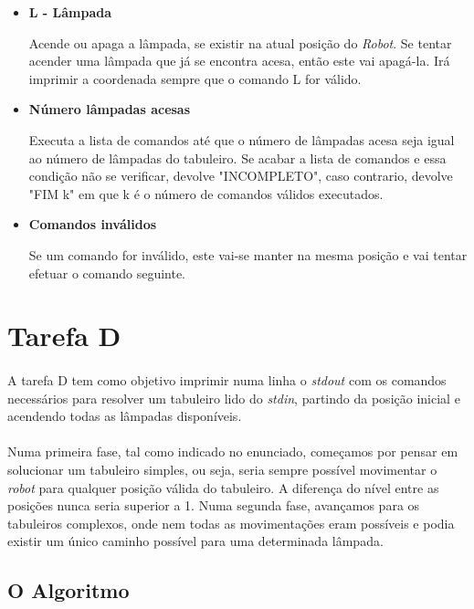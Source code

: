 \documentclass[a4paper,12pt]{article}
\begin{document}
\begin{itemize}
\item {\textbf{L - Lâmpada}}

Acende ou apaga a lâmpada, se existir na atual posição do \emph{Robot}. Se tentar acender uma lâmpada que já se encontra acesa, então este vai apagá-la. Irá imprimir a coordenada sempre que o comando L for válido.

\item {\textbf{Número lâmpadas acesas}}

Executa a lista de comandos até que o número de lâmpadas acesa seja igual ao número de lâmpadas do tabuleiro. Se acabar a lista de comandos e essa condição não se verificar, devolve "INCOMPLETO", caso contrario, devolve "FIM k" em que k é o número de comandos válidos executados.

\item {\textbf{Comandos inválidos}}

Se um comando for inválido, este vai-se manter na mesma posição e vai tentar efetuar o comando seguinte.

\end{itemize}


\section{Tarefa D}

\paragraph{}
A tarefa D tem como objetivo imprimir numa linha o \emph{stdout} com os comandos necessários para resolver um tabuleiro lido do \emph{stdin}, partindo da posição inicial e acendendo todas as lâmpadas disponíveis.

\paragraph{}
Numa primeira fase, tal como indicado no enunciado, começamos por pensar em solucionar um tabuleiro simples, ou seja, seria sempre possível movimentar o \emph{robot} para qualquer posição válida do tabuleiro. A diferença do nível entre as posições nunca seria superior a 1. Numa segunda fase, avançamos para os tabuleiros complexos, onde nem todas as movimentações eram possíveis e podia existir um único caminho possível para uma determinada lâmpada.

\subsection{O Algoritmo}
\end{document}
